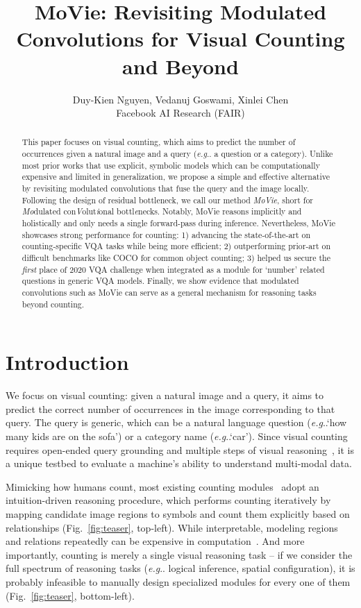 \documentclass{article} \usepackage[dvipsnames,table]{xcolor}
\title{MoVie: Revisiting Modulated Convolutions for Visual Counting and Beyond}
\author{Duy-Kien Nguyen, Vedanuj Goswami, Xinlei Chen \\
Facebook AI Research (FAIR)
}
\makeatletter
\newcommand{\ours}[0]{MoVie\xspace}
\DeclareRobustCommand\onedot{\futurelet\@let@token\@onedot}
\def\@onedot{\ifx\@let@token.\else.\null\fi\xspace}
\def\eg{\emph{e.g}\onedot} \def\Eg{\emph{E.g}\onedot}
\makeatother
\begin{document}
\maketitle

\begin{abstract}
This paper focuses on visual counting, which aims to predict the number of occurrences given a natural image and a query (\eg a question or a category). Unlike most prior works that use explicit, symbolic models which can be computationally expensive and limited in generalization, we propose a simple and effective alternative by revisiting modulated convolutions that fuse the query and the image locally. Following the design of residual bottleneck, we call our method \emph{\ours}, short for \emph{Mo}dulated con\emph{V}olut\emph{i}onal bottl\emph{e}necks. Notably, \ours reasons implicitly and holistically and only needs a single forward-pass during inference. Nevertheless, \ours showcases strong performance for counting: 1) advancing the state-of-the-art on counting-specific VQA tasks while being more efficient; 2) outperforming prior-art on difficult benchmarks like COCO for common object counting; 3) helped us secure the \emph{first} place of 2020 VQA challenge when integrated as a module for `number' related questions in generic VQA models. Finally, we show evidence that modulated convolutions such as \ours can serve as a general mechanism for reasoning tasks beyond counting. 
\end{abstract}


\section{Introduction\label{sec:intro}}

We focus on visual counting: given a natural image and a query, it aims to predict the correct number of occurrences in the image corresponding to that query. The query is generic, which can be a natural language question (\eg `how many kids are on the sofa') or a category name (\eg `car'). Since visual counting requires open-ended query grounding and multiple steps of visual reasoning~\cite{zhang2018learning}, it is a unique testbed to evaluate a machine's ability to understand multi-modal data.

Mimicking how humans count, most existing counting modules~\cite{trott2018interpretable} adopt an intuition-driven reasoning procedure, which performs counting iteratively by mapping candidate image regions to symbols and count them explicitly based on relationships (Fig.~\ref{fig:teaser}, top-left). While interpretable, modeling regions and relations repeatedly can be expensive in computation~\cite{jiang2020defense}. And more importantly, counting is merely a single visual reasoning task -- if we consider the full spectrum of reasoning tasks (\eg logical inference, spatial configuration), it is probably infeasible to manually design specialized modules for every one of them (Fig.~\ref{fig:teaser}, bottom-left).
\end{document}
